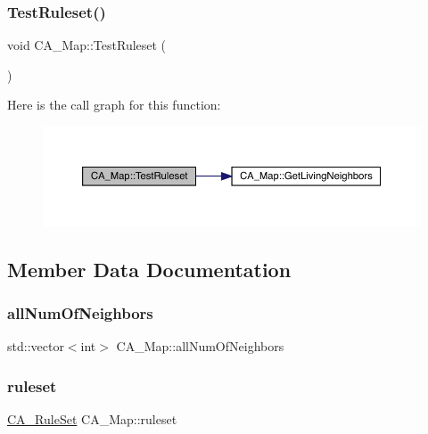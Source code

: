 \subsubsection{\texorpdfstring{Test\+Ruleset()}{TestRuleset()}}
{\footnotesize\ttfamily void C\+A\+\_\+\+Map\+::\+Test\+Ruleset (\begin{DoxyParamCaption}{ }\end{DoxyParamCaption})}

Here is the call graph for this function\+:
\nopagebreak
\begin{figure}[H]
\begin{center}
\leavevmode
\includegraphics[width=350pt]{class_c_a___map_a7a3a75540c418bdcee3689ecfca4cbff_cgraph}
\end{center}
\end{figure}


\subsection{Member Data Documentation}
\mbox{\label{class_c_a___map_a621e0347874d4f80984e7644059a542e}} 
\subsubsection{\texorpdfstring{all\+Num\+Of\+Neighbors}{allNumOfNeighbors}}
{\footnotesize\ttfamily std\+::vector$<$int$>$ C\+A\+\_\+\+Map\+::all\+Num\+Of\+Neighbors\hspace{0.3cm}{\ttfamily [private]}}

\mbox{\label{class_c_a___map_a7f21b6e31fec0a42ba6b47c93e7675fd}} 
\subsubsection{\texorpdfstring{ruleset}{ruleset}}
{\footnotesize\ttfamily \mbox{\hyperlink{_c_a_map_8hpp_a8502e9e74cc08ed2c245d58ff7cd4a88}{C\+A\+\_\+\+Rule\+Set}} C\+A\+\_\+\+Map\+::ruleset\hspace{0.3cm}{\ttfamily [private]}}



